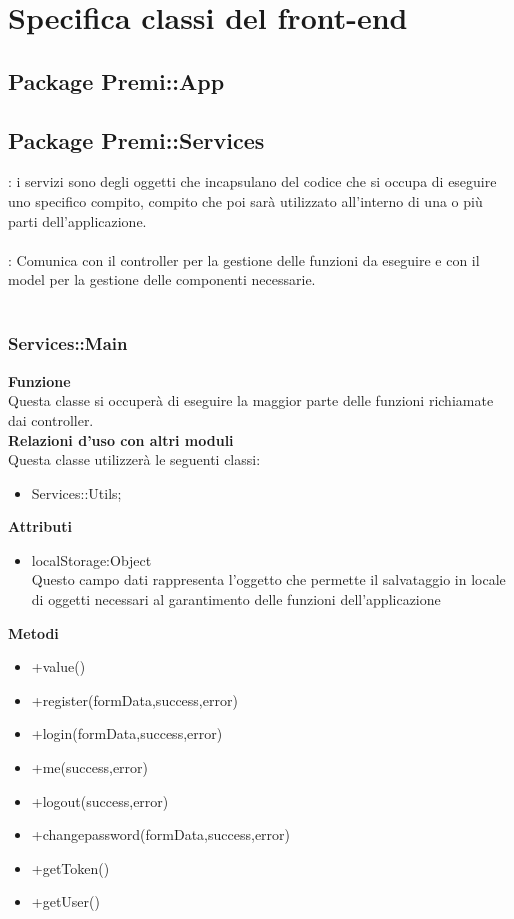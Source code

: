 \section {Specifica classi del front-end}
\subsection{Package Premi::App}

\subsection {Package Premi::Services}
\label{sec:services}
\textbf{\tipo}: i servizi sono degli oggetti che incapsulano del codice che si occupa di eseguire uno specifico compito, compito che poi sarà utilizzato all’interno di una o più parti dell’applicazione.\\\\
\textbf{\relaz}: Comunica con il controller per la gestione delle funzioni da eseguire e con il model per la gestione delle componenti necessarie.\\\\
\subsubsection{Services::Main}
		\label{sub:servicesMain}
		\textbf{Funzione}\\
		\indent Questa classe si occuperà di eseguire la maggior parte delle funzioni richiamate dai controller.\\
		\textbf{Relazioni d'uso con altri moduli}\\
		\indent Questa classe utilizzerà le seguenti classi:
		\begin{itemize}
		\item Services::Utils;
		\end{itemize}
		\textbf{Attributi}\\
		\begin{itemize}
		\item localStorage:Object\\
		Questo campo dati rappresenta l’oggetto che permette il salvataggio in locale di oggetti necessari al garantimento delle funzioni dell'applicazione
		\end{itemize}
		\textbf{Metodi}
		\begin{itemize}
		\item +value()
		\item +register(formData,success,error)
		\item +login(formData,success,error)
		\item +me(success,error)
		\item +logout(success,error)
		\item +changepassword(formData,success,error)
		\item +getToken()
		\item +getUser()

		\end{itemize} 
